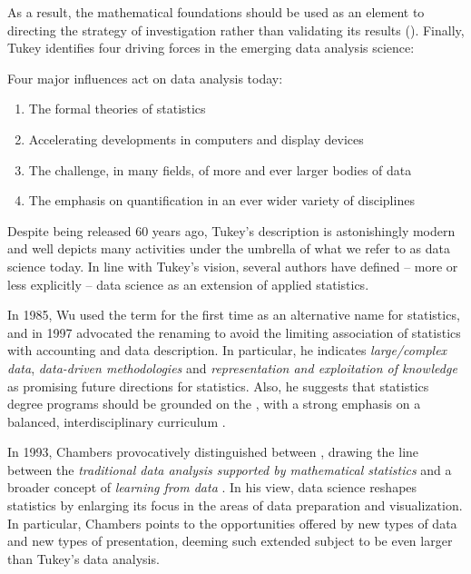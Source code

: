 As a result, the mathematical foundations should be used as an element to directing the strategy of investigation rather than validating its results ().
Finally, Tukey identifies four driving forces in the emerging data analysis science:
\begin{displayquote}
Four major influences act on data analysis today:
\begin{enumerate}
    \item The formal theories of statistics
    \item Accelerating developments in computers and display devices
    \item The challenge, in many fields, of more and ever larger bodies of data
    \item The emphasis on quantification in an ever wider variety of disciplines
\end{enumerate}
\end{displayquote}
Despite being released 60 years ago, Tukey's description is astonishingly modern and well depicts many activities under the umbrella of what we refer to as data science today.
In line with Tukey's vision, several authors have defined -- more or less explicitly -- data science as an extension of applied statistics.

In 1985, Wu used the term  for the first time as an alternative name for statistics, and in 1997 advocated the renaming  to avoid the limiting association of statistics with accounting and data description.
In particular, he indicates \textit{large/complex data}, \textit{data-driven methodologies} and \textit{representation and exploitation of knowledge} as promising future directions for statistics. Also, he suggests that statistics degree programs should be grounded on the , with a strong emphasis on a balanced, interdisciplinary curriculum \cite{wu1997statistic}.

In 1993, Chambers provocatively distinguished between , drawing the line between the \textit{traditional data analysis supported by mathematical statistics} and a broader concept of \textit{learning from data} \cite{chambers1993greater}.
In his view, data science reshapes statistics by enlarging its focus in the areas of data preparation and visualization. In particular, Chambers points to the opportunities offered by new types of data and new types of presentation, deeming such extended subject to be even larger than Tukey's data analysis.

